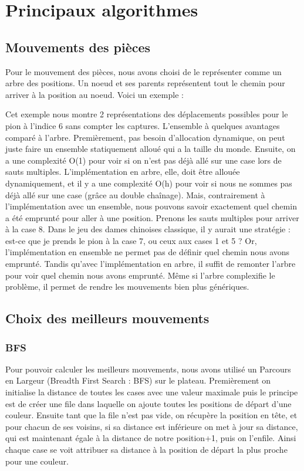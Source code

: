\section{Principaux algorithmes}
\subsection{Mouvements des pièces}
Pour le mouvement des pièces, nous avons choisi de le représenter comme
un arbre des positions. Un noeud et ses parents représentent tout le 
chemin pour arriver à la position au noeud. Voici un exemple :



Cet exemple nous montre 2 représentations des déplacements possibles pour
le pion à l'indice 6 sans compter les captures. L'ensemble à quelques avantages comparé à l'arbre.
Premièrement, pas besoin d'allocation dynamique, on peut juste faire un ensemble statiquement alloué
qui a la taille du monde. Ensuite, on a une complexité O(1) pour voir si on n'est pas déjà allé sur une case
lors de sauts multiples. L'implémentation en arbre, elle, doit être allouée dynamiquement,
et il y a une complexité O(h) pour voir si nous ne sommes pas déjà allé sur une case (grâce au double chaînage).
Mais, contrairement à l'implémentation avec un ensemble, nous pouvons savoir
exactement quel chemin a été emprunté pour aller à une position. Prenons les sauts
multiples pour arriver à la case 8. Dans le jeu des dames chinoises classique,
il y aurait une stratégie : est-ce que je prends le pion à la case 7, ou ceux aux cases 1 et 5 ?
Or, l'implémentation en ensemble ne permet pas de définir quel chemin nous avons emprunté.
Tandis qu'avec l'implémentation en arbre, il suffit de remonter l'arbre pour voir quel chemin nous avons emprunté.
Même si l'arbre complexifie le problème, il permet de rendre les mouvements bien plus génériques.


\subsection{Choix des meilleurs mouvements}
\subsubsection{BFS}
Pour pouvoir calculer les meilleurs mouvements, nous avons utilisé un Parcours en Largeur (Breadth First Search : BFS) sur le plateau. 
Premièrement on initialise la distance de toutes les cases avec une valeur maximale puis
le principe est de créer une file dans laquelle on ajoute toutes les positions de départ d'une couleur.
Ensuite tant que la file n'est pas vide, on récupère la position en tête, et pour chacun de ses voisins, 
si sa distance est inférieure on met à jour sa distance, qui est maintenant égale à la distance de notre position+1,
puis on l'enfile.
Ainsi chaque case se voit attribuer sa distance à la position de départ la plus proche pour une couleur. 
 
